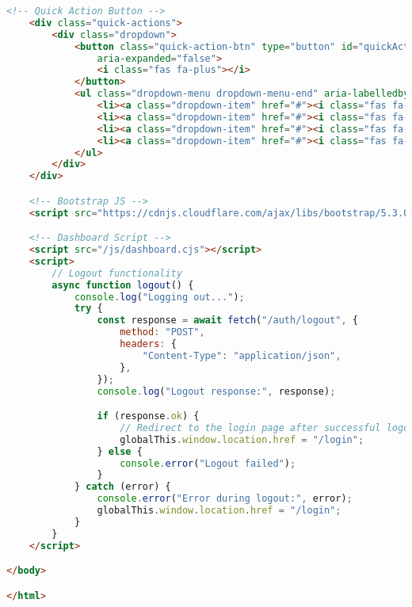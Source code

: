 \begin{lstlisting}[language=HTML]
    <!-- Quick Action Button -->
    <div class="quick-actions">
        <div class="dropdown">
            <button class="quick-action-btn" type="button" id="quickActionsDropdown" data-bs-toggle="dropdown"
                aria-expanded="false">
                <i class="fas fa-plus"></i>
            </button>
            <ul class="dropdown-menu dropdown-menu-end" aria-labelledby="quickActionsDropdown">
                <li><a class="dropdown-item" href="#"><i class="fas fa-exchange-alt me-2"></i> New Transfer</a></li>
                <li><a class="dropdown-item" href="#"><i class="fas fa-credit-card me-2"></i> Pay Bill</a></li>
                <li><a class="dropdown-item" href="#"><i class="fas fa-mobile-alt me-2"></i> Mobile Deposit</a></li>
                <li><a class="dropdown-item" href="#"><i class="fas fa-user-friends me-2"></i> Send to Friend</a></li>
            </ul>
        </div>
    </div>

    <!-- Bootstrap JS -->
    <script src="https://cdnjs.cloudflare.com/ajax/libs/bootstrap/5.3.0/js/bootstrap.bundle.min.js"></script>

    <!-- Dashboard Script -->
    <script src="/js/dashboard.cjs"></script>
    <script>
        // Logout functionality
        async function logout() {
            console.log("Logging out...");
            try {
                const response = await fetch("/auth/logout", {
                    method: "POST",
                    headers: {
                        "Content-Type": "application/json",
                    },
                });
                console.log("Logout response:", response);

                if (response.ok) {
                    // Redirect to the login page after successful logout
                    globalThis.window.location.href = "/login";
                } else {
                    console.error("Logout failed");
                }
            } catch (error) {
                console.error("Error during logout:", error);
                globalThis.window.location.href = "/login";
            }
        }
    </script>

</body>

</html>
\end{lstlisting}

